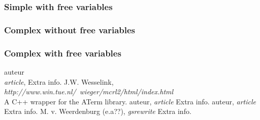 \documentclass[a4paper,10pt]{article}
\begin{document}
\subsubsection{Simple with free variables}

\subsubsection{Complex without free variables}

\subsubsection{Complex with free variables}

\newpage
\begin{thebibliography}{99}   auteur\\
   \textit{article},
   Extra info.
   J.W. Wesselink,
   \textit{http://www.win.tue.nl/~wieger/mcrl2/html/index.html}\\
   A C++ wrapper for the ATerm library.
   auteur,
   \textit{article}
   Extra info.
   auteur,
   \textit{article}
   Extra info.
   M. v. Weerdenburg (e.a??),
   \textit{gsrewrite}
   Extra info.

\end{thebibliography}

\newpage
\end{document}
